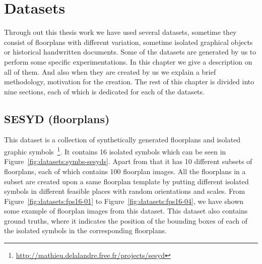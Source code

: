 \chapter{Datasets}
\label{app:datasets}
\graphicspath{{./chapters/Appendix/figs/}}
Through out this thesis work we have used several datasets, sometime they consist of floorplans with different variation, sometime isolated graphical objects or historical handwritten documents. Some of the datasets are generated by us to perform some specific experimentations. In this chapter we give a description on all of them. And also when they are created by us we explain a brief methodology, motivation for the creation. The rest of this chapter is divided into nine sections, each of which is dedicated for each of the datasets.
\section{SESYD (floorplans)}
\label{sec:datasets:sesyd}
This dataset is a collection of synthetically generated floorplans and isolated graphic symbols~\cite{Delalandre2008}\footnote{\url{http://mathieu.delalandre.free.fr/projects/sesyd}}. It contains 16 isolated symbols which can be seen in Figure~\ref{fig:datasets:symbs-sesyds}. Apart from that it has 10 different subsets of floorplans, each of which contains 100 floorplan images. All the floorplans in a subset are created upon a same floorplan template by putting different isolated symbols in different feasible places with random orientations and scales. From Figure~\ref{fig:datasets:fps16-01} to Figure~\ref{fig:datasets:fps16-04}, we have shown some example of floorplan images from this dataset. This dataset also contains ground truths, where it indicates the position of the bounding boxes of each of the isolated symbols in the corresponding floorplans.

